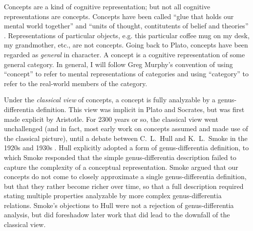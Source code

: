 \documentclass[12pt]{amsart}
\begin{document}
Concepts are a kind of cognitive representation; but not all cognitive representations are concepts. Concepts have been called ``glue that holds our mental world together'' \cite{murphy_big_2002} and ``units of thought, contitutents of belief and theories'' \cite{carey_origin_2009}.  Representations of particular objects, e.g. this particular coffee mug on my desk, my grandmother, etc., are not concepts. Going back to Plato, concepts have been regarded as \emph{general} in character. A concept is a cognitive representation of some general category. In general, I will follow Greg Murphy's convention of using ``concept'' to refer to mental representations of categories and using ``category'' to refer to the real-world members of the category.

Under the \emph{classical view} of concepts, a concept is fully analyzable by a genus-differentia definition. This view was implicit in Plato and Socrates, but was first made explicit by Aristotle. For 2300 years or so, the classical view went unchallenged (and in fact, most early work on concepts assumed and made use of the classical picture), until a debate between  C.\ L.\ Hull and K.\ L.\ Smoke in the 1920s and 1930s \cite{hull_quantitative_1920} \cite{smoke_objective_1932}. Hull explicitly adopted a form of genus-differentia definition, to which Smoke responded that the simple genus-differentia description failed to capture the complexity of a conceptual representation. Smoke argued that our concepts do not come to closely approximate a single genus-differentia definition, but that they rather  become richer over time, so that a full description required stating multiple properties analyzable by more complex genus-differentia relations. Smoke's objections to Hull were not a rejection of genus-differentia analysis, but did foreshadow later work that did lead to the downfall of the classical view.
\end{document}
